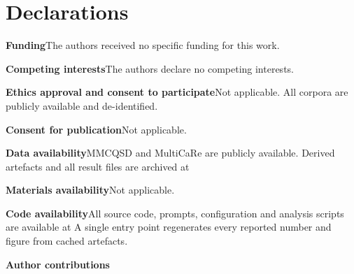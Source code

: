 \documentclass[pdflatex,sn-mathphys-num]{sn-jnl}
\theoremstyle{thmstyleone}
\theoremstyle{thmstyletwo}
\theoremstyle{thmstylethree}
\begin{document}




\section*{Declarations}

\textbf{Funding}\quad The authors received no specific funding for this work.

\textbf{Competing interests}\quad The authors declare no competing interests.

\textbf{Ethics approval and consent to participate}\quad Not applicable. All corpora
are publicly available and de-identified.

\textbf{Consent for publication}\quad Not applicable.

\textbf{Data availability}\quad MMCQSD and MultiCaRe are publicly available.
Derived artefacts and all result files are archived at %

\textbf{Materials availability}\quad Not applicable.

\textbf{Code availability}\quad All source code, prompts, configuration and analysis
scripts are available at %
A single entry point regenerates every reported number and figure from cached
artefacts.

\textbf{Author contributions}\quad %


\end{document}
